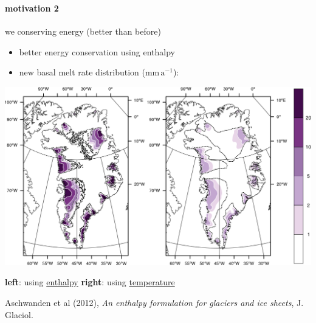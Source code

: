 \documentclass[hide notes,intlimits]{beamer}
\begin{document}
\begin{frame}
  \frametitle{\whytitle}
  \framesubtitle{motivation 2}

\vspace{-6mm}
\begin{center}
  we  conserving energy (better than before)
\end{center}
  
\vspace{-2mm}
  \begin{itemize}
    \item better energy conservation using enthalpy
    \item new basal melt rate distribution ($\text{mm}\,\text{a}^{-1}$):
  \end{itemize}

  \begin{center}
    \includegraphics[height=0.57\textheight]{figs/enthalpy-model-crop}
    
    \medskip
    \scriptsize \textbf{left}: using \underline{enthalpy} \qquad\qquad\quad \textbf{right}: using \underline{temperature}

\medskip
    \tiny Aschwanden et al (2012), \emph{An enthalpy formulation for glaciers and ice sheets}, J. Glaciol.
  \end{center}
\end{frame}
\end{document}
